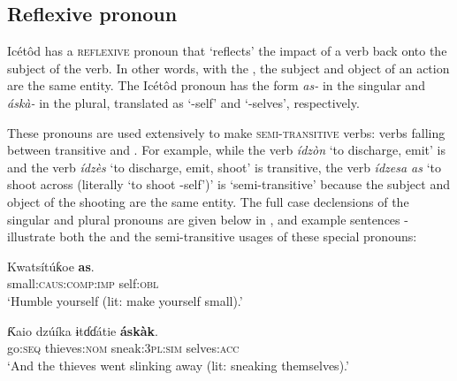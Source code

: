 \subsection{Reflexive pronoun}\label{sec:5.8}


Icétôd has a \textsc{reflexive} pronoun that ‘reflects’ the impact of a verb back onto the subject of the verb. In other words, with the , the subject and object of an action are the same entity. The Icétôd  pronoun has the form \textit{as{\Í}-} in the singular and \textit{ás{\Í}kà-} in the plural, translated as ‘-self’ and ‘-selves’, respectively.


These  pronouns are used extensively to make \textsc{semi-transitive} verbs: verbs falling between transitive and . For example, while the verb \textit{ídzòn} ‘to discharge, emit’ is  and the verb \textit{ídzès} ‘to discharge, emit, shoot’ is transitive, the verb \textit{ídzesa as{\Í}} ‘to shoot across (literally `to shoot -self’)’ is ‘semi-transitive’ because the subject and object of the shooting are the same entity. The full case declensions of the singular and plural  pronouns are given below in , and example sentences - illustrate both the  and the semi-transitive usages of these special pronouns:




\ea\label{ex:pro:5}
\gll Kwatsítúƙoe     \textbf{as}. \\
small:\textsc{caus:comp:imp}   self:\textsc{obl}    \\
\glt ‘Humble yourself (lit: make yourself small).’ 
\z




\ea\label{ex:pro:6}
\gll Ƙaio     dzúíka   ɨt{\Í}ɗ{\Í}ɗátie     \textbf{ás{\Í}kàk\ᵃ}. \\
go:\textsc{seq}   thieves:\textsc{nom}   sneak:\textsc{3pl:sim} selves:\textsc{acc}    \\
\glt ‘And the thieves went slinking away (lit: sneaking themselves).’ 
\z



